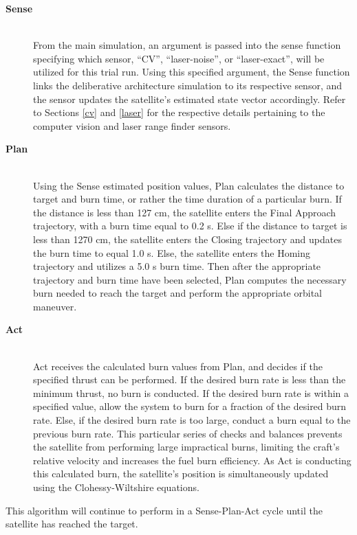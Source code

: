 \documentclass[journal, 10pt]{IEEEtran}
\begin{document}
\begin{description}
\item[\textbf{Sense}] \hfill \\
From the main simulation, an argument is passed into the sense function specifying which sensor, ``CV'', ``laser-noise'', or ``laser-exact'', will be utilized for this trial run. Using this specified argument, the Sense function links the deliberative architecture simulation to its respective sensor, and the sensor updates the satellite's estimated state vector accordingly. Refer to Sections \ref{cv} and \ref{laser} for the respective details pertaining to the computer vision and laser range finder sensors.

\item[\textbf{Plan}] \hfill \\
Using the Sense estimated position values, Plan calculates the distance to target and burn time, or rather the time duration of a particular burn. If the distance is less than 127 cm, the satellite enters the Final Approach trajectory, with a burn time equal to 0.2 s. Else if the distance to target is less than 1270 cm, the satellite enters the Closing trajectory and updates the burn time to equal 1.0 s. Else, the satellite enters the Homing trajectory and utilizes a 5.0 s burn time. Then after the appropriate trajectory and burn time have been selected, Plan computes the necessary burn needed to reach the target and perform the appropriate orbital maneuver.

\item[\textbf{Act}] \hfill \\
Act receives the calculated burn values from Plan, and decides if the specified thrust can be performed. If the desired burn rate is less than the minimum thrust, no burn is conducted. If the desired burn rate is within a specified value, allow the system to burn for a fraction of the desired burn rate. Else, if the desired burn rate is too large, conduct a burn equal to the previous burn rate. This particular series of checks and balances prevents the satellite from performing large impractical burns, limiting the craft's relative velocity and increases the fuel burn efficiency. As Act is conducting this calculated burn, the satellite's position is simultaneously updated using the Clohessy-Wiltshire equations.
\end{description}

This algorithm will continue to perform in a Sense-Plan-Act cycle until the satellite has reached the target.
\end{document}
